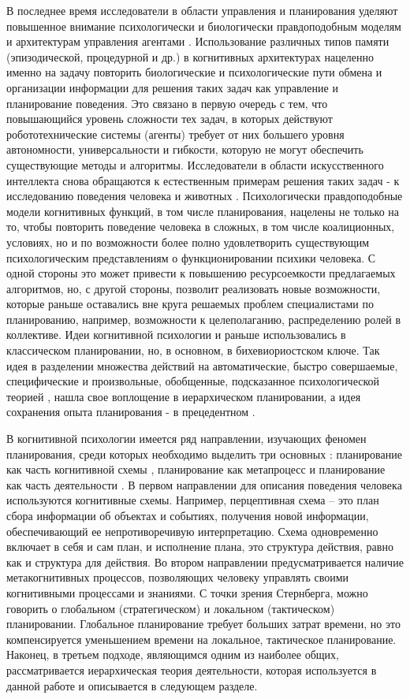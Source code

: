\documentclass[12pt]{scrartcl}
\begin{document}
	В последнее время исследователи в области управления и планирования уделяют повышенное внимание психологически и биологически правдоподобным моделям и архитектурам управления агентами \cite{Kelley2006,Sun2012a}. Использование различных типов памяти (эпизодической, процедурной и др.) в когнитивных архитектурах нацеленно именно на задачу повторить биологические и психологические пути обмена и организации информации для решения таких задач как управление и планирование поведения. Это связано в первую очередь с тем, что повышающийся уровень сложности тех задач, в которых действуют робототехнические системы (агенты) требует от них большего уровня автономности, универсальности и гибкости, которую не могут обеспечить существующие методы и алгоритмы. Исследователи в области искусственного интеллекта снова обращаются к естественным примерам решения таких задач - к исследованию поведения человека и животных \cite{Redko2016,Panov2016d}. Психологически правдоподобные модели когнитивных функций, в том числе планирования, нацелены не только на то, чтобы повторить поведение человека в сложных, в том числе коалиционных, условиях, но и по возможности более полно удовлетворить существующим психологическим представлениям о функционировании психики человека. С одной стороны это может привести к повышению ресурсоемкости предлагаемых алгоритмов, но, с другой стороны, позволит реализовать новые возможности, которые раньше оставались вне круга решаемых проблем специалистами по планированию, например, возможности к целеполаганию, распределению ролей в коллективе. Идеи когнитивной психологии и раньше использовались в классическом планировании, но, в основном, в бихевиориостском ключе. Так идея в разделении множества действий на автоматические, быстро совершаемые, специфические и произвольные, обобщенные, подсказанное психологической теорией \cite{Kahneman2011}, нашла свое воплощение в иерархическом планировании, а идея сохранения опыта планирования - в прецедентном \cite{Hammond1990,DeLaRosa2013,Borrajo2015}.
	
	В когнитивной психологии имеется ряд направлении, изучающих феномен планирования, среди которых необходимо выделить три основных \cite{Chuvgunova2015}: планирование как часть когнитивной схемы \cite{Neisser1976}, планирование как метапроцесс \cite{Flavell1979,Sternberg2000} и планирование как часть деятельности \cite{Leontiev1977}. В первом направлении для описания поведения человека используются когнитивные схемы. Например, перцептивная схема – это план сбора информации об объектах и событиях, получения новой информации, обеспечивающий ее непротиворечивую интерпретацию. Схема одновременно включает в себя и сам план, и исполнение плана, это структура действия, равно как и структура для действия. Во втором направлении предусматривается наличие метакогнитивных процессов, позволяющих человеку управлять своими когнитивными процессами и знаниями. С точки зрения Стернберга, можно говорить о глобальном (стратегическом) и локальном (тактическом) планировании. Глобальное планирование требует больших затрат времени, но это компенсируется уменьшением времени на локальное, тактическое планирование. Наконец, в третьем подходе, являющимся одним из наиболее общих, рассматривается иерархическая теория деятельности, которая используется в данной работе и описывается в следующем разделе.
	
\end{document}
